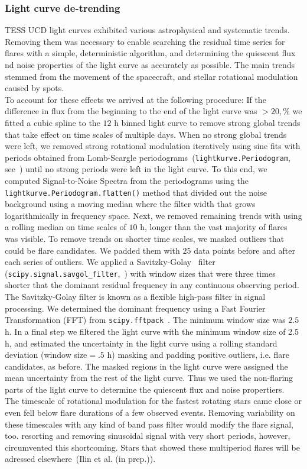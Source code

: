 \documentclass{aastex62}
\begin{document}
\subsubsection{Light curve de-trending}
TESS UCD light curves exhibited various astrophysical and systematic trends. Removing them was necessary to enable searching the residual time series for flares with a simple, deterministic algorithm, and determining the quiescent flux nd noise properties of the light curve as accurately as possible. The main trends stemmed from the movement of the spacecraft, and stellar rotational modulation caused by spots.
\\
To account for these effects we arrived at the following procedure: If the difference in flux from the beginning to the end of the light curve was $>20,\%$ we fitted a cubic spline to the $12$ h binned light curve to remove strong global trends that take effect on time scales of multiple days. When no strong global trends were left, we removed strong rotational modulation iteratively using sine fits with periods obtained from  Lomb-Scargle periodograms~(\texttt{lightkurve.Periodogram}, see~\citealt{lomb1976,scargle1982}) until no strong periods were left in the light curve. To this end, we computed Signal-to-Noise Spectra from the periodograms using the \texttt{lightkurve.Periodogram.flatten()} method that divided out the noise background using a moving median where the filter width that grows logarithmically in frequency space.
Next, we removed remaining trends with using a rolling median on time scales of $10$ h, longer than the vast majority of flares was visible. To remove trends on shorter time scales, we masked outliers that could be flare candidates. We padded them with $25$ data points before and after each series of outliers. We applied a Savitzky-Golay~\citep{SavGol1964} filter (\texttt{scipy.signal.savgol\_filter},~\citealt{scipy2019}) with window sizes that were three times shorter that the dominant residual frequency in any continuous observing period. The Savitzky-Golay filter is known as a flexible high-pass filter in signal processing. We determined the dominant frequency using a Fast Fourier Transformation (FFT) from \texttt{scipy.fftpack}~\citep{scipy2019}. The minimum window size was $2.5$ h. In a final step we filtered the light curve with the minimum window size of 2.5 h, and estimated the uncertainty in the light curve using a rolling standard deviation (window size$= .5$ h) masking and padding positive outliers, i.e. flare candidates, as before. The masked regions in the light curve were assigned the mean uncertainty from the rest of the light curve. Thus we used the non-flaring parts of the light curve to determine the quiescent flux and noise propertiers.
\\
The timescale of rotational modulation for the fastest rotating stars came close or even fell below flare durations of a few observed events. Removing variability on these timescales with any kind of band pass filter would modify the flare signal, too.  resorting and removing sinusoidal signal with very short periods, however, circumvented this shortcoming. Stars that showed these multiperiod flares will be adressed elsewhere~(Ilin et al. (in prep.)).
\end{document}
